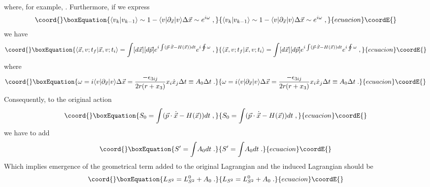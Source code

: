 \documentclass[12pt,a4paper]{article}
\begin{document}
where, for example, \coordHE{}. Furthermore, if we express 
\begin{equation}\coord{}\boxEquation{
\langle v_{k}|v_{k-1}\rangle \sim 1-\langle v|\partial _{\vec{x}}|v\rangle
\Delta \vec{x}\sim e^{i\omega }\;,  \nonumber
}{
\langle v_{k}|v_{k-1}\rangle \sim 1-\langle v|\partial _{\vec{x}}|v\rangle
\Delta \vec{x}\sim e^{i\omega }\;,  \nonumber
}{ecuacion}\coordE{}\end{equation}
we have 
\begin{equation}\coord{}\boxEquation{
\langle \vec{x},v;t_{f}|\vec{x},v;t_{i}\rangle =\int [d\vec{x}][d\vec{p}
]e^{i\int (\vec{p}\cdot \dot{\vec{x}}-H(\vec{x}))dt}e^{i\oint \omega }\;,
}{
\langle \vec{x},v;t_{f}|\vec{x},v;t_{i}\rangle =\int [d\vec{x}][d\vec{p}
]e^{i\int (\vec{p}\cdot \dot{\vec{x}}-H(\vec{x}))dt}e^{i\oint \omega }\;,
}{ecuacion}\coordE{}\end{equation}
where 
\begin{equation}\coord{}\boxEquation{
\omega =i\langle v|\partial _{\vec{x}}|v\rangle \Delta \vec{x}={\frac{
-\epsilon _{3ij}}{2r(r+x_{3})}}x_{i}\dot{x}_{j}\Delta t\equiv A_{0}\Delta
t\;.  \nonumber
}{
\omega =i\langle v|\partial _{\vec{x}}|v\rangle \Delta \vec{x}={\frac{
-\epsilon _{3ij}}{2r(r+x_{3})}}x_{i}\dot{x}_{j}\Delta t\equiv A_{0}\Delta
t\;.  \nonumber
}{ecuacion}\coordE{}\end{equation}
Consequently, to the original action 
\begin{equation}\coord{}\boxEquation{
S_{0}=\int (\vec{p}\cdot \dot{\vec{x}}-H(\vec{x}))dt\;,
}{
S_{0}=\int (\vec{p}\cdot \dot{\vec{x}}-H(\vec{x}))dt\;,
}{ecuacion}\coordE{}\end{equation}
we have to add 
\begin{equation}\coord{}\boxEquation{
S^{\prime }={\int }A_{0}dt\;.
}{
S^{\prime }={\int }A_{0}dt\;.
}{ecuacion}\coordE{}\end{equation}
Which implies emergence of the geometrical term added to the original
Lagrangian and the induced Lagrangian should be 
\begin{equation}\coord{}\boxEquation{
L_{S^{2}}=L_{S^{2}}^{0}+A_{0}\;.  \label{LS2}
}{
L_{S^{2}}=L_{S^{2}}^{0}+A_{0}\;.  }{ecuacion}\coordE{}\end{equation}
\end{document}
